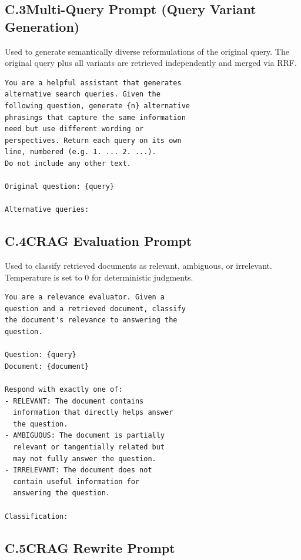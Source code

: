 \documentclass[11pt]{article}
\begin{document}
\subsection*{C.3\quad Multi-Query Prompt (Query Variant Generation)}

Used to generate semantically diverse reformulations of the original query. The original query plus all variants are retrieved independently and merged via RRF.

\begin{scriptsize}
\begin{verbatim}
You are a helpful assistant that generates
alternative search queries. Given the
following question, generate {n} alternative
phrasings that capture the same information
need but use different wording or
perspectives. Return each query on its own
line, numbered (e.g. 1. ... 2. ...).
Do not include any other text.

Original question: {query}

Alternative queries:
\end{verbatim}
\end{scriptsize}

\subsection*{C.4\quad CRAG Evaluation Prompt}

Used to classify retrieved documents as relevant, ambiguous, or irrelevant. Temperature is set to 0 for deterministic judgments.

\begin{scriptsize}
\begin{verbatim}
You are a relevance evaluator. Given a
question and a retrieved document, classify
the document's relevance to answering the
question.

Question: {query}
Document: {document}

Respond with exactly one of:
- RELEVANT: The document contains
  information that directly helps answer
  the question.
- AMBIGUOUS: The document is partially
  relevant or tangentially related but
  may not fully answer the question.
- IRRELEVANT: The document does not
  contain useful information for
  answering the question.

Classification:
\end{verbatim}
\end{scriptsize}

\subsection*{C.5\quad CRAG Rewrite Prompt}
\end{document}
